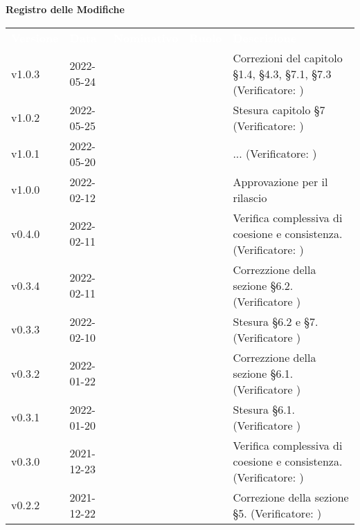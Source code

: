 
{\LARGE{\textbf{Registro delle Modifiche}}} \\
\renewcommand{\arraystretch}{1.5}
\begin{longtable}{ m{}<{\centering}  m{}<{\centering}  m{}<{\centering}  m{}<{\centering}  m{}<{\centering} }
	\rowcolor{darkblue}
	\textcolor{white}{\textbf{Versione}} &\textcolor{white}{\textbf{Data}}& \textcolor{white}{\textbf{Nominativo}} & \textcolor{white}{\textbf{Ruolo}}& \textcolor{white}{\textbf{Descrizione}} \\ 	
	v1.0.3& 2022-05-24 & \MB & \AM{} & Correzioni del capitolo §1.4, §4.3, §7.1, §7.3 (Verificatore: \textit{\GC})\\

	v1.0.2& 2022-05-25 & \MB & \AM{} & Stesura capitolo §7 (Verificatore: \textit{\GC})\\

	v1.0.1& 2022-05-20 & \EP & \AM{} & ...  (Verificatore:  \textit{\GC})\\

	v1.0.0& 2022-02-12 & \GC & \RE{} & Approvazione per il rilascio\\

	v0.4.0& 2022-02-11 & \EP{} & \AM {} & Verifica complessiva di coesione e consistenza. (Verificatore: \textit{\MG})\\	

	v0.3.4& 2022-02-11 & \EP{} & \AM{} & Correzzione della sezione §6.2. (Verificatore \textit{\MG}) \\

	v0.3.3& 2022-02-10 & \EP{} & \AM{} & Stesura §6.2 e \S{}7. (Verificatore \textit{\MG}) \\

	v0.3.2& 2022-01-22 & \EP{} & \AM{} & Correzzione della sezione §6.1. (Verificatore \textit{\MG}) \\

	v0.3.1& 2022-01-20 & \EP{} & \AM{} & Stesura §6.1. (Verificatore \textit{\MG}) \\

	v0.3.0& 2021-12-23 & \EP{} & \AM {} & Verifica complessiva di coesione e consistenza. (Verificatore: \textit{\MG})\\	

	v0.2.2& 2021-12-22 & \EP{} & \AM{} & Correzione della sezione §5. (Verificatore: \textit{\MG})\\
	

\end{longtable}

